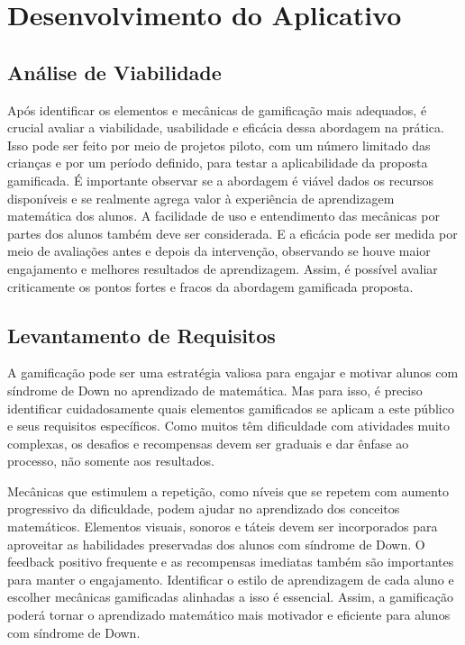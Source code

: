 \chapter{Desenvolvimento do Aplicativo}\label{chp:des}

\section{Análise de Viabilidade}

Após identificar os elementos e mecânicas de gamificação mais adequados, é crucial avaliar a viabilidade, usabilidade e eficácia dessa abordagem na prática. Isso pode ser feito por meio de projetos piloto, com um número limitado das crianças e por um período definido, para testar a aplicabilidade da proposta gamificada. É importante observar se a abordagem é viável dados os recursos disponíveis e se realmente agrega valor à experiência de aprendizagem matemática dos alunos. A facilidade de uso e entendimento das mecânicas por partes dos alunos também deve ser considerada. E a eficácia pode ser medida por meio de avaliações antes e depois da intervenção, observando se houve maior engajamento e melhores resultados de aprendizagem. Assim, é possível avaliar criticamente os pontos fortes e fracos da abordagem gamificada proposta.

\section{Levantamento de Requisitos}

A gamificação pode ser uma estratégia valiosa para engajar e motivar alunos com síndrome de Down no aprendizado de matemática. Mas para isso, é preciso identificar cuidadosamente quais elementos gamificados se aplicam a este público e seus requisitos específicos. Como muitos têm dificuldade com atividades muito complexas, os desafios e recompensas devem ser graduais e dar ênfase ao processo, não somente aos resultados.

Mecânicas que estimulem a repetição, como níveis que se repetem com aumento progressivo da dificuldade, podem ajudar no aprendizado dos conceitos matemáticos. Elementos visuais, sonoros e táteis devem ser incorporados para aproveitar as habilidades preservadas dos alunos com síndrome de Down. O feedback positivo frequente e as recompensas imediatas também são importantes para manter o engajamento. Identificar o estilo de aprendizagem de cada aluno e escolher mecânicas gamificadas alinhadas a isso é essencial. Assim, a gamificação poderá tornar o aprendizado matemático mais motivador e eficiente para alunos com síndrome de Down.


